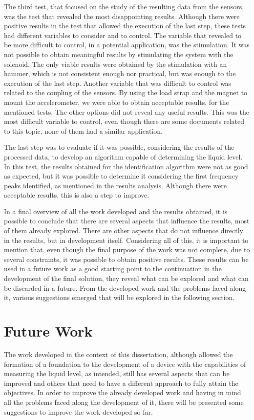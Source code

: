 The third test, that focused on the study of the resulting data from the sensors, was the test that revealed the most disappointing results. Although there were positive results in the test that allowed the execution of the last step, these tests had different variables to consider and to control. The variable that revealed to be more difficult to control, in a potential application, was the stimulation. It was not possible to obtain meaningful results by stimulating the system with the solenoid. The only viable results were obtained by the stimulation with an hammer, which is not consistent enough nor practical, but was enough to the execution of the last step. Another variable that was difficult to control was related to the coupling of the sensors. By using the load strap and the magnet to mount the accelerometer, we were able to obtain acceptable results, for the mentioned tests. The other options did not reveal any useful results. This was the most difficult variable to control, even though there are some documents related to this topic, none of them had a similar application. 

The last step was to evaluate if it was possible, considering the results of the processed data, to develop an algorithm capable of determining the liquid level. In this test, the results obtained for the identification algorithm were not as good as expected, but it was possible to determine it considering the first frequency peaks identified, as mentioned in the results analysis. Although there were acceptable results, this is also a step to improve.

In a final overview of all the work developed and the results obtained, it is possible to conclude that there are several aspects that influence the results, most of them already explored. There are other aspects that do not influence directly in the results, but in development itself. Considering all of this, it is important to mention that, even though the final purpose of the work was not complete, due to several constraints, it was possible to obtain positive results. These results can be used in a future work as a good starting point to the continuation in the development of the final solution, they reveal what can be explored and what can be discarded in a future. From the developed work and the problems faced along it, various suggestions emerged that will be explored in the following section. 
\section{Future Work}
The work developed in the context of this dissertation, although allowed the formation of a foundation to the development of a device with the capabilities of measuring the liquid level, as intended, still has several aspects that can be improved and others that need to have a different approach to fully attain the objectives. In order to improve the already developed work and having in mind all the problems faced along the development of it, there will be presented some suggestions to improve the work developed so far. 

